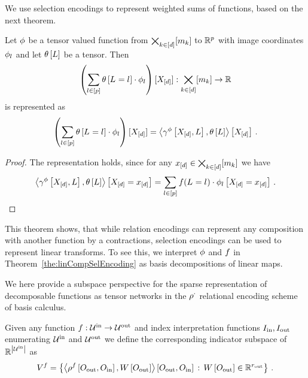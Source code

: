 We use selection encodings to represent weighted sums of functions, based on the next theorem.

\begin{theorem}
    \label{the:linCompSelEncoding}
    Let $\phi$ be a tensor valued function from $\bigtimes_{k\in[d]}[m_{k}]$ to $\mathbb{R}^{p}$ with image coordinates $\phi_{l}$ and let $\theta\left[L\right]$ be a tensor.
    Then
    \[ \left(\sum_{l\in[p]}\theta\left[L_{}=l_{}\right] \cdot \phi_{l} \right) [X_{[d]}] : \bigtimes_{k\in[d]}[m_{k}] \rightarrow \mathbb{R} \]
    is represented as
    \[ \left(\sum_{l\in[p]}\theta\left[L_{}=l_{}\right]\cdot \phi_{l} \right) [X_{[d]}]
    = \left\langle \gamma^{\phi}\left[X_{[d]},L\right] , \theta\left[L\right]\right\rangle \left[ X_{[d]} \right] \, . \]
\end{theorem}
\begin{proof}
    The representation holds, since for any $x_{[d]}\in\bigtimes_{k\in[d]}[m_{k}]$ we have
    \begin{align*}
        \left\langle \gamma^{\phi}\left[X_{[d]},L\right],\theta\left[L\right]\right\rangle \left[ X_{[d]}=x_{[d]} \right]
        = \sum_{l\in[p]}f(L_{}=l_{})\cdot\phi_{l}\left[X_{[d]}=x_{[d]}\right] \, .
    \end{align*}
\end{proof}

This theorem shows, that while relation encodings can represent any composition with another function by a contractions, selection encodings can be used to represent linear transforms.
To see this, we interpret $\phi$ and $f$ in Theorem~\ref{the:linCompSelEncoding} as basis decompositions of linear maps.


\label{sec:indicatorFeatures}

We here provide a subspace perspective for the sparse representation of decomposable functions as tensor networks in the $\rho^{\cdot}$ relational encoding scheme of basis calculus.

\begin{definition}
    Given any function $f:\mathcal{U}^{\mathrm{in}}\rightarrow\mathcal{U}^{\mathrm{out}}$ and index interpretation functions $I_{\mathrm{in}},I_{\mathrm{out}}$ enumerating $\mathcal{U}^{\mathrm{in}}$ and $\mathcal{U}^{\mathrm{out}}$ we define the corresponding indicator subspace of $\mathbb{R}^{\left|\mathcal{U}^{\mathrm{in}}\right|}$ as
    \begin{align*}
        V^{f}
        = \left\{ \left\langle 
            \rho^{f}\left[O_{\mathrm{out}},O_{\mathrm{in}}\right],W\left[O_{\mathrm{out}}\right]
        \right\rangle \left[ O_{\mathrm{out}},O_{\mathrm{in}} \right] \, : \, W\left[O_{\mathrm{out}}\right] \in \mathbb{R}^{r_{\mathrm{out}}}
        \right\} \, .
    \end{align*}
\end{definition}


